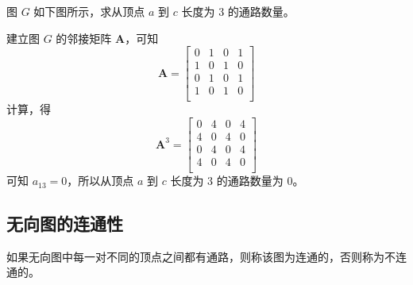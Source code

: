\begin{collections}
    \begin{example}
        图 $G$ 如下图所示，求从顶点 $a$ 到 $c$ 长度为 $3$ 的通路数量。

        \begin{center}
        \end{center}
    \end{example}

    \begin{solution}
        建立图 $G$ 的邻接矩阵 $\symbf{A}$，可知
        \begin{equation*}
            \symbf{A}=
            \begin{bmatrix}
                0 & 1 & 0 & 1 \\
                1 & 0 & 1 & 0 \\
                0 & 1 & 0 & 1 \\
                1 & 0 & 1 & 0 \\
            \end{bmatrix}
        \end{equation*}
        计算，得
        \begin{equation*}
            \symbf{A}^3=
            \begin{bmatrix}
                0 & 4 & 0 & 4 \\
                4 & 0 & 4 & 0 \\
                0 & 4 & 0 & 4 \\
                4 & 0 & 4 & 0 \\
            \end{bmatrix}
        \end{equation*}
        可知 $a_{13} = 0$，所以从顶点 $a$ 到 $c$ 长度为 $3$ 的通路数量为 $0$。
    \end{solution}
\end{collections}


\subsection{无向图的连通性}
\begin{definition}[无向图的连通性]\label{def:无向图的连通性}
    如果无向图中每一对不同的顶点之间都有通路，则称该图为连通的，否则称为不连通的。
\end{definition}

